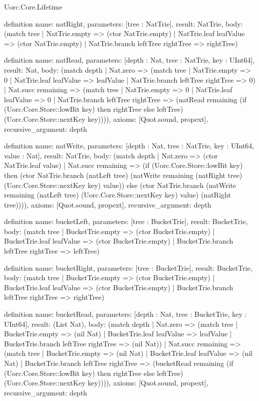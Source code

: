 \begin{lexlean}{Uorc.Core.Lifetime}
\begin{semanticmodule}
definition{
  name: natRight,
  parameters: [tree : NatTrie],
  result: NatTrie,
  body: (match tree
    | NatTrie.empty => (ctor NatTrie.empty)
    | NatTrie.leaf leafValue => (ctor NatTrie.empty)
    | NatTrie.branch leftTree rightTree => rightTree)
}

definition{
  name: natRead,
  parameters: [depth : Nat, tree : NatTrie, key : UInt64],
  result: Nat,
  body: (match depth
    | Nat.zero => (match tree
      | NatTrie.empty => 0
      | NatTrie.leaf leafValue => leafValue
      | NatTrie.branch leftTree rightTree => 0)
    | Nat.succ remaining => (match tree
      | NatTrie.empty => 0
      | NatTrie.leaf leafValue => 0
      | NatTrie.branch leftTree rightTree => (natRead remaining (if (Uorc.Core.Store::lowBit key) then rightTree else leftTree) (Uorc.Core.Store::nextKey key)))),
  axioms: [Quot.sound, propext],
  recursive_argument: depth
}

definition{
  name: natWrite,
  parameters: [depth : Nat, tree : NatTrie, key : UInt64, value : Nat],
  result: NatTrie,
  body: (match depth
    | Nat.zero => (ctor NatTrie.leaf value)
    | Nat.succ remaining => (if (Uorc.Core.Store::lowBit key) then (ctor NatTrie.branch (natLeft tree) (natWrite remaining (natRight tree) (Uorc.Core.Store::nextKey key) value)) else (ctor NatTrie.branch (natWrite remaining (natLeft tree) (Uorc.Core.Store::nextKey key) value) (natRight tree)))),
  axioms: [Quot.sound, propext],
  recursive_argument: depth
}

definition{
  name: bucketLeft,
  parameters: [tree : BucketTrie],
  result: BucketTrie,
  body: (match tree
    | BucketTrie.empty => (ctor BucketTrie.empty)
    | BucketTrie.leaf leafValue => (ctor BucketTrie.empty)
    | BucketTrie.branch leftTree rightTree => leftTree)
}

definition{
  name: bucketRight,
  parameters: [tree : BucketTrie],
  result: BucketTrie,
  body: (match tree
    | BucketTrie.empty => (ctor BucketTrie.empty)
    | BucketTrie.leaf leafValue => (ctor BucketTrie.empty)
    | BucketTrie.branch leftTree rightTree => rightTree)
}

definition{
  name: bucketRead,
  parameters: [depth : Nat, tree : BucketTrie, key : UInt64],
  result: (List Nat),
  body: (match depth
    | Nat.zero => (match tree
      | BucketTrie.empty => (nil Nat)
      | BucketTrie.leaf leafValue => leafValue
      | BucketTrie.branch leftTree rightTree => (nil Nat))
    | Nat.succ remaining => (match tree
      | BucketTrie.empty => (nil Nat)
      | BucketTrie.leaf leafValue => (nil Nat)
      | BucketTrie.branch leftTree rightTree => (bucketRead remaining (if (Uorc.Core.Store::lowBit key) then rightTree else leftTree) (Uorc.Core.Store::nextKey key)))),
  axioms: [Quot.sound, propext],
  recursive_argument: depth
}


\end{semanticmodule}
\end{lexlean}
